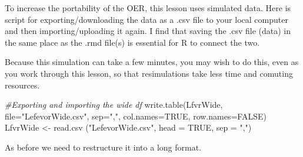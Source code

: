 \documentclass[
  11pt,
]{book}
\newenvironment{Shaded}{\begin{snugshade}}{\end{snugshade}}
\newcommand{\AttributeTok}[1]{\textcolor[rgb]{0.77,0.63,0.00}{#1}}
\newcommand{\CommentTok}[1]{\textcolor[rgb]{0.56,0.35,0.01}{\textit{#1}}}
\newcommand{\ConstantTok}[1]{\textcolor[rgb]{0.00,0.00,0.00}{#1}}
\newcommand{\FunctionTok}[1]{\textcolor[rgb]{0.00,0.00,0.00}{#1}}
\newcommand{\NormalTok}[1]{#1}
\newcommand{\OtherTok}[1]{\textcolor[rgb]{0.56,0.35,0.01}{#1}}
\newcommand{\StringTok}[1]{\textcolor[rgb]{0.31,0.60,0.02}{#1}}
\begin{document}
To increase the portability of the OER, this lesson uses simulated data. Here is script for exporting/downloading the data as a .csv file to your local computer and then importing/uploading it again. I find that saving the .csv file (data) in the same place as the .rmd file(s) is essential for R to connect the two.

Because this simulation can take a few minutes, you may wish to do this, even as you work through this lesson, so that resimulations take less time and comuting resources.

\begin{Shaded}
\begin{Highlighting}[]
\CommentTok{\#Exporting and importing the wide df}
\FunctionTok{write.table}\NormalTok{(LfvrWide, }\AttributeTok{file=}\StringTok{"LefevorWide.csv"}\NormalTok{, }\AttributeTok{sep=}\StringTok{","}\NormalTok{, }\AttributeTok{col.names=}\ConstantTok{TRUE}\NormalTok{, }\AttributeTok{row.names=}\ConstantTok{FALSE}\NormalTok{)}
\NormalTok{LfvrWide }\OtherTok{\textless{}{-}} \FunctionTok{read.csv}\NormalTok{ (}\StringTok{"LefevorWide.csv"}\NormalTok{, }\AttributeTok{head =} \ConstantTok{TRUE}\NormalTok{, }\AttributeTok{sep =} \StringTok{","}\NormalTok{)}
\end{Highlighting}
\end{Shaded}

As before we need to restructure it into a long format.
\end{document}
